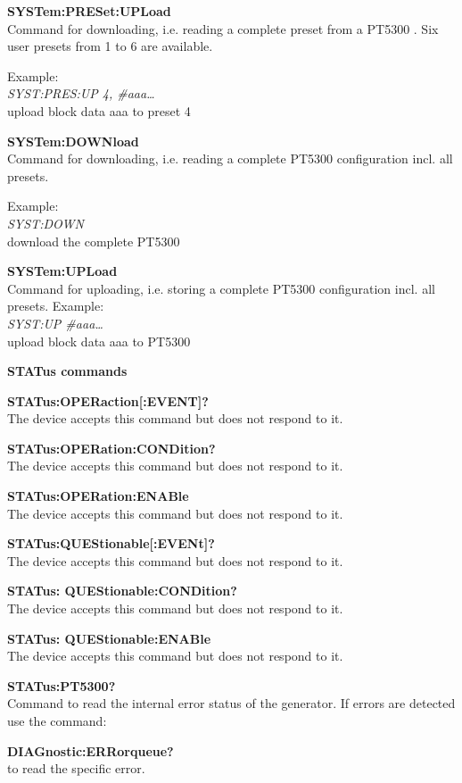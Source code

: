 \textbf{SYSTem:PRESet:UPLoad}\\
Command for downloading, i.e. reading a complete preset from a PT5300 . Six user presets from 1 to 6 are available.\NoTelnetSupport

Example:\\
\textit{SYST:PRES:UP 4, \#aaa\ldots}\\
upload block data aaa to preset 4

\textbf{SYSTem:DOWNload}\\
Command for downloading, i.e. reading a complete PT5300 configuration incl. all presets.\NoTelnetSupport

Example:\\
\textit{SYST:DOWN}\\
download the complete PT5300

\textbf{SYSTem:UPLoad}\\
Command for uploading, i.e. storing a complete PT5300 configuration incl. all presets.\NoTelnetSupport
Example:\\
\textit{SYST:UP \#aaa\ldots}\\
upload block data aaa to PT5300

\textbf{STATus commands}

\textbf{STATus:OPERaction[:EVENT]?}\\
The device accepts this command but does not respond to it.

\textbf{STATus:OPERation:CONDition?}\\
The device accepts this command but does not respond to it.

\textbf{STATus:OPERation:ENABle}\\
The device accepts this command but does not respond to it.

\textbf{STATus:QUEStionable[:EVENt]?}\\
The device accepts this command but does not respond to it.

\textbf{STATus: QUEStionable:CONDition?}\\
The device accepts this command but does not respond to it.

\textbf{STATus: QUEStionable:ENABle}\\
The device accepts this command but does not respond to it.

\textbf{STATus:PT5300?}\\
Command to read the internal error status of the generator. If errors are detected use the command:

\textbf{DIAGnostic:ERRorqueue?}\\
to read the specific error. 

